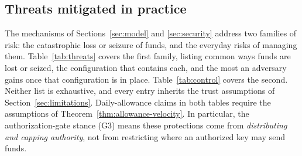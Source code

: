 \documentclass[11pt,DIV=11,parskip=half-]{scrartcl}
\begin{document}
\subsection{Threats mitigated in practice}
\label{sec:threats}

The mechanisms of Sections~\ref{sec:model} and \ref{sec:security} address two families of risk: the catastrophic loss or seizure of funds, and the everyday risks of managing them. Table~\ref{tab:threats} covers the first family, listing common ways funds are lost or seized, the configuration that contains each, and the most an adversary gains once that configuration is in place. Table~\ref{tab:control} covers the second. Neither list is exhaustive, and every entry inherits the trust assumptions of Section~\ref{sec:limitations}. Daily-allowance claims in both tables require the assumptions of Theorem~\ref{thm:allowance-velocity}. In particular, the authorization-gate stance (G3) means these protections come from \emph{distributing and capping authority}, not from restricting where an authorized key may send funds.
\end{document}
